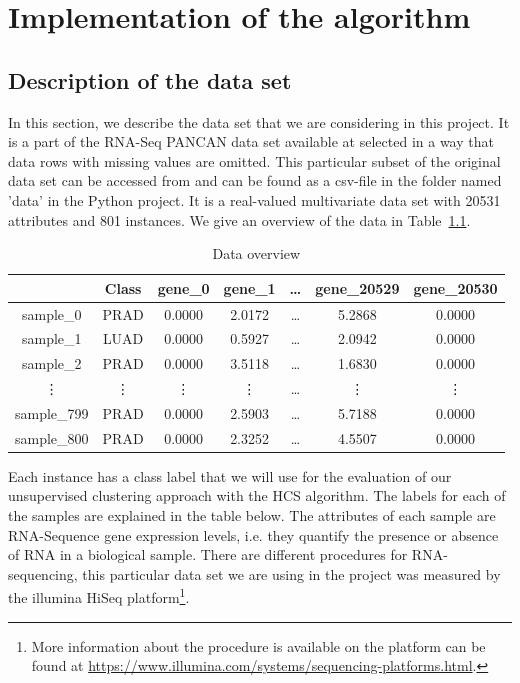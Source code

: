 \documentclass[paper=a4,fontsize=11pt,DIV=8,BCOR=5mm,twoside,pdftex,bibtotocnumbered]{scrreprt}
\theoremstyle{plain}
\begin{document}
\chapter{Implementation of the algorithm}\label{ch:implementation}
\section{Description of the data set}\label{sec:description_data}
In this section, we describe the data set that we are considering in this project. It is a part of the RNA-Seq PANCAN data set available at \cite{Ellrott2013} selected in a way that data rows with missing values are omitted. This particular subset of the original data set can be accessed from \cite{Fiorini2016} and can be found as a csv-file in the folder named 'data' in the Python project. It is a real-valued multivariate data set with 20531 attributes and 801 instances. We give an overview of the data in Table~\ref{tab:head}.

\begin{table}
	\caption{Data overview}
	\centering
	\begin{tabular}{|c||c|c|c|c|c|c|}
		\hline
		& Class & gene\_0 & gene\_1 & \dots & gene\_20529 & gene\_20530 \\
		\hline
		sample\_0 & PRAD & 0.0000 & 2.0172 & \dots & 5.2868 & 0.0000 \\
		sample\_1 & LUAD & 0.0000 & 0.5927 & \dots & 2.0942 & 0.0000 \\
		sample\_2 & PRAD & 0.0000 & 3.5118 & \dots & 1.6830 & 0.0000 \\
		\vdots & \vdots & \vdots & \vdots & \dots & \vdots & \vdots \\
		sample\_799 & PRAD & 0.0000 & 2.5903 & \dots & 5.7188 & 0.0000 \\
		sample\_800 & PRAD & 0.0000 & 2.3252 & \dots & 4.5507 & 0.0000 \\
		\hline
	\end{tabular}
	
	\label{tab:head}
\end{table}

Each instance has a class label that we will use for the evaluation of our unsupervised clustering approach with the HCS algorithm. The labels for each of the samples are explained in the table below. The attributes of each sample are RNA-Sequence gene expression levels, i.e. they quantify the presence or absence of RNA in a biological sample. There are different procedures for RNA-sequencing, this particular data set we are using in the project was measured by the illumina HiSeq platform\footnote{More information about the procedure is available on the platform can be found at \url{https://www.illumina.com/systems/sequencing-platforms.html}.}. 
\end{document}
